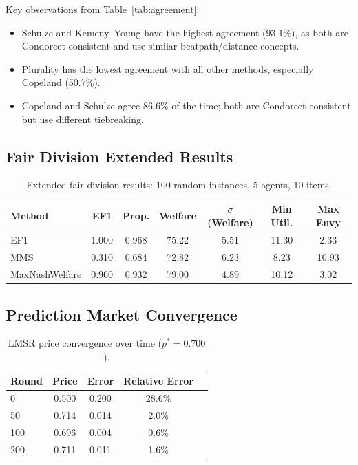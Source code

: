 \documentclass[10pt]{article}
\begin{document}
Key observations from Table~\ref{tab:agreement}:
\begin{itemize}[leftmargin=*,itemsep=1pt]
  \item Schulze and Kemeny--Young have the highest agreement (93.1\%), as both are Condorcet-consistent and use similar beatpath/distance concepts.
  \item Plurality has the lowest agreement with all other methods, especially Copeland (50.7\%).
  \item Copeland and Schulze agree 86.6\% of the time; both are Condorcet-consistent but use different tiebreaking.
\end{itemize}

\subsection{Fair Division Extended Results}

\begin{table}[H]
\centering
\caption{Extended fair division results: 100 random instances, 5 agents, 10 items.}
\label{tab:fairdiv-ext}
\begin{tabular}{lcccccc}
\toprule
\textbf{Method} & \textbf{EF1} & \textbf{Prop.} & \textbf{Welfare} & \textbf{$\sigma$(Welfare)} & \textbf{Min Util.} & \textbf{Max Envy} \\
\midrule
EF1            & 1.000 & 0.968 & 75.22 & 5.51 & 11.30 & 2.33 \\
MMS            & 0.310 & 0.684 & 72.82 & 6.23 &  8.23 & 10.93 \\
MaxNashWelfare & 0.960 & 0.932 & 79.00 & 4.89 & 10.12 &  3.02 \\
\bottomrule
\end{tabular}
\end{table}

\subsection{Prediction Market Convergence}

\begin{table}[H]
\centering
\caption{LMSR price convergence over time ($p^* = 0.700$).}
\label{tab:convergence}
\begin{tabular}{lcccc}
\toprule
\textbf{Round} & \textbf{Price} & \textbf{Error} & \textbf{Relative Error} \\
\midrule
0   & 0.500 & 0.200 & 28.6\% \\
50  & 0.714 & 0.014 & 2.0\% \\
100 & 0.696 & 0.004 & 0.6\% \\
200 & 0.711 & 0.011 & 1.6\% \\
\bottomrule
\end{tabular}
\end{table}
\end{document}
